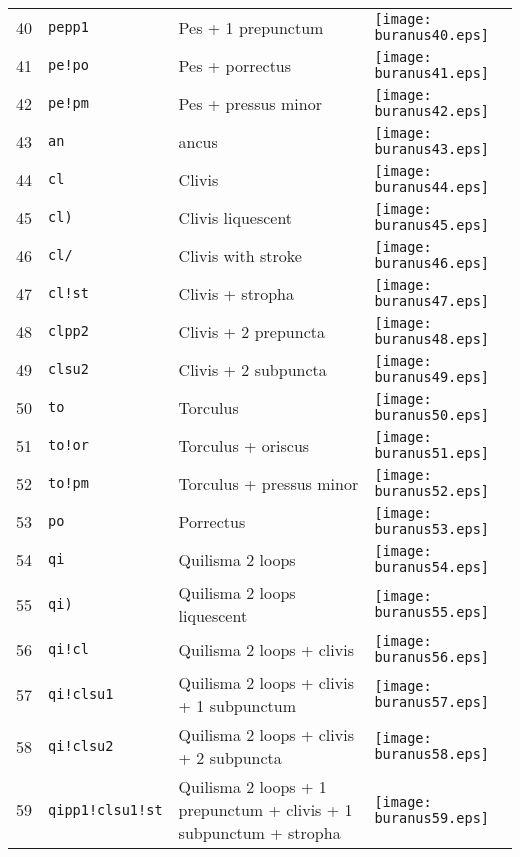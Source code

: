 \documentclass{scrarticle}
\begin{document}
\begin{longtable}{l|l|l|l}
40 & \texttt{pepp1} & Pes + 1 prepunctum & \texttt{[image: buranus40.eps]} \\
41 & \texttt{pe!po} & Pes + porrectus & \texttt{[image: buranus41.eps]} \\
42 & \texttt{pe!pm} & Pes + pressus minor & \texttt{[image: buranus42.eps]} \\
43 & \texttt{an} & ancus & \texttt{[image: buranus43.eps]} \\
44 & \texttt{cl} & Clivis & \texttt{[image: buranus44.eps]} \\
45 & \texttt{cl)} & Clivis liquescent & \texttt{[image: buranus45.eps]} \\
46 & \texttt{cl/} & Clivis with stroke & \texttt{[image: buranus46.eps]} \\
47 & \texttt{cl!st} & Clivis + stropha & \texttt{[image: buranus47.eps]} \\
48 & \texttt{clpp2} & Clivis + 2 prepuncta & \texttt{[image: buranus48.eps]} \\
49 & \texttt{clsu2} & Clivis + 2 subpuncta & \texttt{[image: buranus49.eps]} \\
50 & \texttt{to} & Torculus & \texttt{[image: buranus50.eps]} \\
51 & \texttt{to!or} & Torculus + oriscus & \texttt{[image: buranus51.eps]} \\
52 & \texttt{to!pm} & Torculus + pressus minor & \texttt{[image: buranus52.eps]} \\
53 & \texttt{po} & Porrectus & \texttt{[image: buranus53.eps]} \\
54 & \texttt{qi} & Quilisma 2 loops & \texttt{[image: buranus54.eps]} \\
55 & \texttt{qi)} & Quilisma 2 loops liquescent & \texttt{[image: buranus55.eps]} \\
56 & \texttt{qi!cl} & Quilisma 2 loops + clivis & \texttt{[image: buranus56.eps]} \\
57 & \texttt{qi!clsu1} & Quilisma 2 loops + clivis + 1 subpunctum & \texttt{[image: buranus57.eps]} \\
58 & \texttt{qi!clsu2} & Quilisma 2 loops + clivis + 2 subpuncta & \texttt{[image: buranus58.eps]} \\
59 & \texttt{qipp1!clsu1!st} & Quilisma 2 loops + 1 prepunctum + clivis + 1 subpunctum + stropha & \texttt{[image: buranus59.eps]} \\

\end{longtable}
\end{document}
